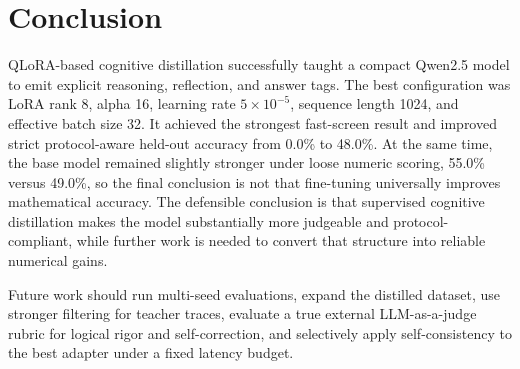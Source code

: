 \documentclass{article}
\begin{document}
\section{Conclusion}
QLoRA-based cognitive distillation successfully taught a compact Qwen2.5 model to emit explicit reasoning, reflection, and answer tags. The best configuration was LoRA rank 8, alpha 16, learning rate $5\times10^{-5}$, sequence length 1024, and effective batch size 32. It achieved the strongest fast-screen result and improved strict protocol-aware held-out accuracy from 0.0\% to 48.0\%. At the same time, the base model remained slightly stronger under loose numeric scoring, 55.0\% versus 49.0\%, so the final conclusion is not that fine-tuning universally improves mathematical accuracy. The defensible conclusion is that supervised cognitive distillation makes the model substantially more judgeable and protocol-compliant, while further work is needed to convert that structure into reliable numerical gains.

Future work should run multi-seed evaluations, expand the distilled dataset, use stronger filtering for teacher traces, evaluate a true external LLM-as-a-judge rubric for logical rigor and self-correction, and selectively apply self-consistency to the best adapter under a fixed latency budget.

\clearpage


\end{document}
